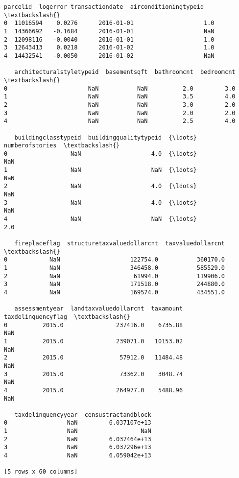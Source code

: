 \documentclass[11pt]{article}
\makeatletter
\newcommand{\boxspacing}{\kern\kvtcb@left@rule\kern\kvtcb@boxsep}
\newcommand{\prompt}[4]{
        {\ttfamily\llap{{\color{#2}[#3]:\hspace{3pt}#4}}\vspace{-\baselineskip}}
    }
\makeatother
\begin{document}
            \begin{tcolorbox}[breakable, size=fbox, boxrule=.5pt, pad at break*=1mm, opacityfill=0]
\prompt{Out}{outcolor}{4}{\boxspacing}
\begin{Verbatim}[commandchars=\\\{\}]
   parcelid  logerror transactiondate  airconditioningtypeid  \textbackslash{}
0  11016594    0.0276      2016-01-01                    1.0
1  14366692   -0.1684      2016-01-01                    NaN
2  12098116   -0.0040      2016-01-01                    1.0
3  12643413    0.0218      2016-01-02                    1.0
4  14432541   -0.0050      2016-01-02                    NaN

   architecturalstyletypeid  basementsqft  bathroomcnt  bedroomcnt  \textbackslash{}
0                       NaN           NaN          2.0         3.0
1                       NaN           NaN          3.5         4.0
2                       NaN           NaN          3.0         2.0
3                       NaN           NaN          2.0         2.0
4                       NaN           NaN          2.5         4.0

   buildingclasstypeid  buildingqualitytypeid  {\ldots}  numberofstories  \textbackslash{}
0                  NaN                    4.0  {\ldots}              NaN
1                  NaN                    NaN  {\ldots}              NaN
2                  NaN                    4.0  {\ldots}              NaN
3                  NaN                    4.0  {\ldots}              NaN
4                  NaN                    NaN  {\ldots}              2.0

   fireplaceflag  structuretaxvaluedollarcnt  taxvaluedollarcnt  \textbackslash{}
0            NaN                    122754.0           360170.0
1            NaN                    346458.0           585529.0
2            NaN                     61994.0           119906.0
3            NaN                    171518.0           244880.0
4            NaN                    169574.0           434551.0

   assessmentyear  landtaxvaluedollarcnt  taxamount  taxdelinquencyflag  \textbackslash{}
0          2015.0               237416.0    6735.88                 NaN
1          2015.0               239071.0   10153.02                 NaN
2          2015.0                57912.0   11484.48                 NaN
3          2015.0                73362.0    3048.74                 NaN
4          2015.0               264977.0    5488.96                 NaN

   taxdelinquencyyear  censustractandblock
0                 NaN         6.037107e+13
1                 NaN                  NaN
2                 NaN         6.037464e+13
3                 NaN         6.037296e+13
4                 NaN         6.059042e+13

[5 rows x 60 columns]
\end{Verbatim}
\end{tcolorbox}
        
\end{document}
